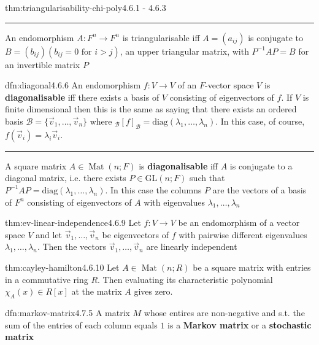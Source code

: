 \documentclass[landscape, 8pt]{extarticle}
\DeclareMathOperator{\Mat}{Mat}
\begin{document}
\begin{multicols}{3}
\begin{thm}[]{thm:triangularisability-chi-poly}{4.6.1 - 4.6.3}
    
    \noindent\rule{\textwidth}{0.2pt}

    An endomorphism $A : F^{n} \to F^{n}$ is triangularisable iff $A = (a_{ij})$ is conjugate to $B = (b_{ij})(b_{ij} = 0 \text{ for $i > j$})$, an upper triangular matrix, with $P^{-1} AP=B$ for an invertible matrix $P$
\end{thm}

\begin{dfn}[Diagonalisability]{dfn:diagonal}{4.6.6}
    An endomorphism $f : V \to V$ of an $F$-vector space $V$ is \textbf{diagonalisable} iff there exists a basis of $V$ consisting of eigenvectors of $f$. If $V$ is finite dimensional then this is the same as saying that there exists an ordered basis $\mathcal{B} = \{\vec{v}_{1},\dots,\vec{v}_{n}\}$ where $_{\mathcal{B}}[f]_{\mathcal{B}} = \text{diag}(\lambda_{1},\dots,\lambda_{n})$. In this case, of course, $f(\vec{v}_{i}) = \lambda_{i}\vec{v}_{i}$.
    
    \noindent\rule{\textwidth}{0.2pt}
    A square matrix $A\in \Mat(n;F)$ is \textbf{diagonalisable} iff $A$ is conjugate to a diagonal matrix, i.e. there exists $P \in \text{GL}(n;F)$ such that $P^{-1}AP = \text{diag}(\lambda_{1},\dots,\lambda_{n})$. In this case the columns $P$ are the vectors of a basis of $F^{n}$ consisting of eigenvectors of $A$ with eigenvalues $\lambda_{1},\dots,\lambda_{n}$
\end{dfn}

\begin{thm}{thm:ev-linear-independence}{4.6.9}
    Let $f : V\to V$ be an endomorphism of a vector space $V$ and let $\vec{v}_{1},\dots,\vec{v}_{n}$ be eigenvectors of $f$ with pairwise different eigenvalues $\lambda_{1},\dots,\lambda_{n}$. Then the vectors $\vec{v}_{1},\dots,\vec{v}_{n}$ are linearly independent
\end{thm}
\newpage

\begin{thm}{thm:cayley-hamilton}{4.6.10}
    Let $A\in \Mat(n;R)$ be a square matrix with entries in a commutative ring $R$. Then evaluating its characteristic polynomial $\chi_{A}(x)\in R[x]$ at the matrix $A$ gives zero.
\end{thm}

\begin{dfn}{dfn:markov-matrix}{4.7.5}
    A matrix $M$ whose entires are non-negative and s.t. the sum of the entries of each column equals $1$ is a \textbf{Markov matrix} or a \textbf{stochastic matrix}


\end{dfn}
\end{multicols}
\end{document}
